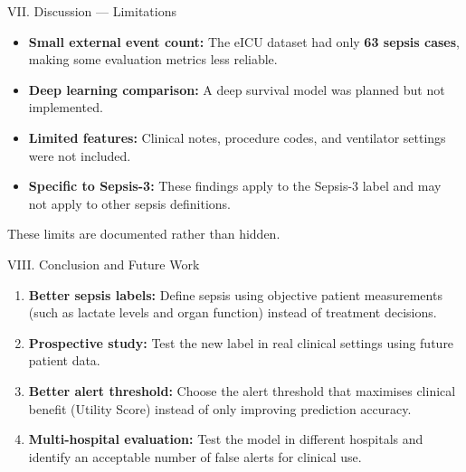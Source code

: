 \documentclass[aspectratio=169,10pt]{beamer}
\begin{document}
\begin{frame}{VII. Discussion --- Limitations}
\begin{itemize}
  \item \textbf{Small external event count:} The eICU dataset had only \textbf{63 sepsis cases}, making some evaluation metrics less reliable.
  \item \textbf{Deep learning comparison:} A deep survival model was planned but not implemented.
  \item \textbf{Limited features:} Clinical notes, procedure codes, and ventilator settings were not included.
  \item \textbf{Specific to Sepsis-3:} These findings apply to the Sepsis-3 label and may not apply to other sepsis definitions.
\end{itemize}

\vspace{8pt}
\begin{exampleblock}{}
  \centering These limits are documented rather than hidden.
\end{exampleblock}
\end{frame}

\begin{frame}{VIII. Conclusion and Future Work}
\begin{enumerate}
  \item \textbf{Better sepsis labels:} Define sepsis using objective patient measurements (such as lactate levels and organ function) instead of treatment decisions.
  \item \textbf{Prospective study:} Test the new label in real clinical settings using future patient data.
  \item \textbf{Better alert threshold:} Choose the alert threshold that maximises clinical benefit (Utility Score) instead of only improving prediction accuracy.
  \item \textbf{Multi-hospital evaluation:} Test the model in different hospitals and identify an acceptable number of false alerts for clinical use.
\end{enumerate}
\end{frame}
\end{document}
